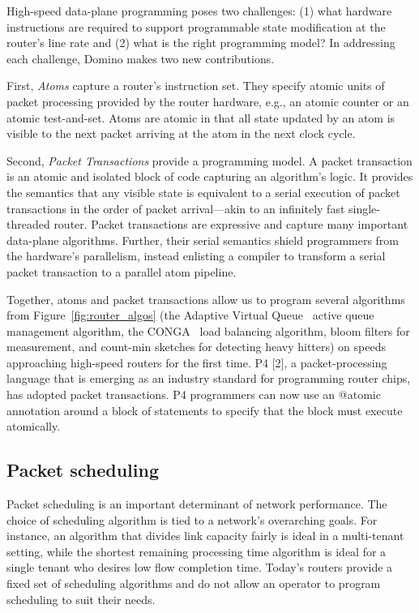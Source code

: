 High-speed data-plane programming poses two challenges: (1) what hardware instructions are required to support programmable state modification at the router’s line rate and (2) what is the right programming model? In addressing each challenge, Domino makes two new contributions.

First, \textit{Atoms} capture a router’s instruction set. They specify atomic
units of packet processing provided by the router hardware, e.g., an atomic
counter or an atomic test-and-set. Atoms are atomic in that all state updated
by an atom is visible to the next packet arriving at the atom in the next clock
cycle.

Second, \textit{Packet Transactions} provide a programming model. A packet
transaction is an atomic and isolated block of code capturing an algorithm’s
logic. It provides the semantics that any visible state is equivalent to a
serial execution of packet transactions in the order of packet arrival—akin to
an infinitely fast single-threaded router. Packet transactions are expressive
and capture many important data-plane algorithms. Further, their serial
semantics shield programmers from the hardware’s parallelism, instead enlisting
a compiler to transform a serial packet transaction to a parallel atom
pipeline.

Together, atoms and packet transactions allow us to program several algorithms
from Figure~\ref{fig:router_algos} (\eg the Adaptive Virtual Queue~\cite{avq}
active queue management algorithm, the CONGA~\cite{conga} load balancing
algorithm, bloom filters for measurement, and count-min sketches for detecting
heavy hitters) on speeds approaching high-speed routers for the first time. P4
[2], a packet-processing language that is emerging as an industry standard for
programming router chips, has adopted packet transactions.  P4 programmers can
now use an @atomic annotation around a block of statements to specify that the
block must execute atomically.

\subsection{Packet scheduling}

Packet scheduling is an important determinant of network performance. The
choice of scheduling algorithm is tied to a network’s overarching goals. For
instance, an algorithm that divides link capacity fairly is ideal in a
multi-tenant setting, while the shortest remaining processing time algorithm is
ideal for a single tenant who desires low flow completion time. Today’s routers
provide a fixed set of scheduling algorithms and do not allow an operator to
program scheduling to suit their needs.

